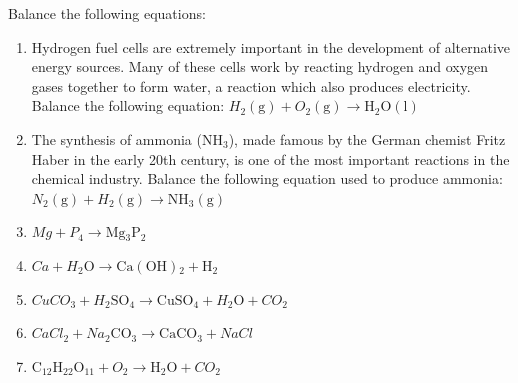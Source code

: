         \label{m38726*id65193}Balance the following equations:\par 
        \label{m38726*id65199}\begin{enumerate}[noitemsep, label=\textbf{\arabic*}. ] 
            \label{m38726*uid17}\item Hydrogen fuel cells are extremely important in the development of alternative energy sources. Many of these cells work by reacting hydrogen and oxygen gases together to form water, a reaction which also produces electricity. Balance the following equation: \begin{math}{{H}}_{2}\left(\mathrm{g}\right)+{{O}}_{2}\left(\mathrm{g}\right)\to \mathrm{H}{}_{2}\mathrm{O}\left(\mathrm{l}\right)\end{math}        \label{m38726*uid18}\item The synthesis of ammonia (\begin{math}\mathrm{NH}{}_{3}\end{math}), made famous by the German chemist Fritz Haber in the early 20th century, is one of the most important reactions in the chemical industry. Balance the following equation used to produce ammonia:
\begin{math}{{N}}_{2}\left(\mathrm{g}\right)+{{H}}_{2}\left(\mathrm{g}\right)\to \mathrm{NH}{}_{3}\left(\mathrm{g}\right)\end{math}
        \label{m38726*uid19}\item 
          \begin{math}{Mg}+{{P}}_{4}\to \mathrm{Mg}{}_{3}{\mathrm{P}}_{2}\end{math}
        \label{m38726*uid20}\item 
          \begin{math}{Ca}+{{H}}_{2}\mathrm{O}\to \mathrm{Ca\left(OH\right)}{}_{2}+\mathrm{H}{}_{2}\end{math}        \label{m38726*uid21}\item 
          \begin{math}{{CuCO}}_{3}+{{H}}_{2}{\mathrm{SO}}_{4}\to \mathrm{CuSO}{}_{4}+{{H}}_{2}\mathrm{O}+{{CO}}_{2}\end{math}
        \label{m38726*uid22}\item 
          \begin{math}{{CaCl}}_{2}+{{Na}}_{2}{\mathrm{CO}}_{3}\to \mathrm{CaCO}{}_{3}+{NaCl}\end{math}        \label{m38726*uid23}\item 
          \begin{math}{\mathrm{C}}_{12}{\mathrm{H}}_{22}{\mathrm{O}}_{11}+{{O}}_{2}\to \mathrm{H}{}_{2}\mathrm{O}+{{CO}}_{2}\end{math}

\end{enumerate}
